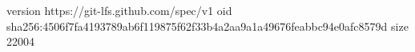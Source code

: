 version https://git-lfs.github.com/spec/v1
oid sha256:4506f7fa4193789ab6f119875f62f33b4a2aa9a1a49676feabbc94e0afc8579d
size 22004
